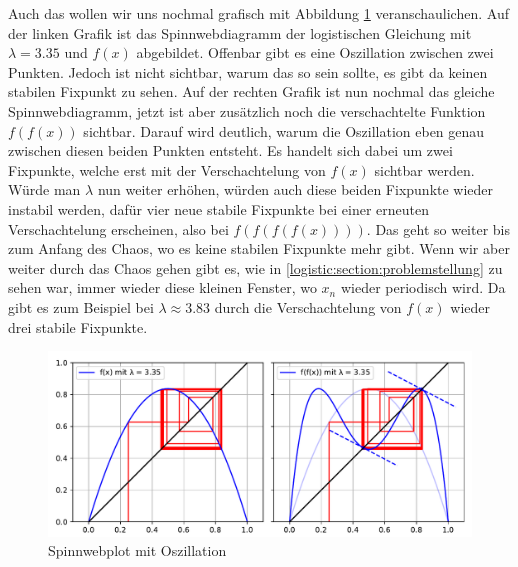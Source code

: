 Auch das wollen wir uns nochmal grafisch mit
Abbildung \ref{fig:web_2} veranschaulichen.  
Auf der linken Grafik ist das Spinnwebdiagramm der 
logistischen Gleichung mit $\lambda = 3.35$ und
$f(x)$ abgebildet. 
Offenbar gibt es eine Oszillation zwischen zwei Punkten.
Jedoch ist nicht sichtbar, warum das so sein sollte,
es gibt da keinen stabilen Fixpunkt zu sehen.
Auf der rechten Grafik ist nun nochmal das gleiche
Spinnwebdiagramm, jetzt ist aber zusätzlich noch
die verschachtelte Funktion $f(f(x))$ sichtbar.
Darauf wird deutlich, warum die Oszillation eben genau 
zwischen diesen beiden Punkten entsteht. 
Es handelt sich dabei um zwei Fixpunkte, welche erst 
mit der Verschachtelung von $f(x)$ sichtbar werden.
Würde man $\lambda$ nun weiter erhöhen, würden auch
diese beiden Fixpunkte wieder instabil werden,
dafür vier neue stabile Fixpunkte bei einer erneuten
Verschachtelung erscheinen, 
also bei $f(f(f(f(x))))$. 
Das geht so weiter bis zum Anfang des Chaos, wo
es keine stabilen Fixpunkte mehr gibt. 
Wenn wir aber weiter durch das Chaos gehen gibt es, 
wie in \ref{logistic:section:problemstellung}
zu sehen war, immer wieder diese kleinen Fenster,
wo $x_n$ wieder periodisch wird. 
Da gibt es zum Beispiel bei
$\lambda \approx 3.83$ 
durch die Verschachtelung von $f(x)$
wieder drei stabile Fixpunkte. 

\begin{figure}
    \includegraphics[width=\linewidth]{papers/logistic/figures/web_2.pdf}
    \caption{Spinnwebplot mit Oszillation}
    \label{fig:web_2}
\end{figure}

